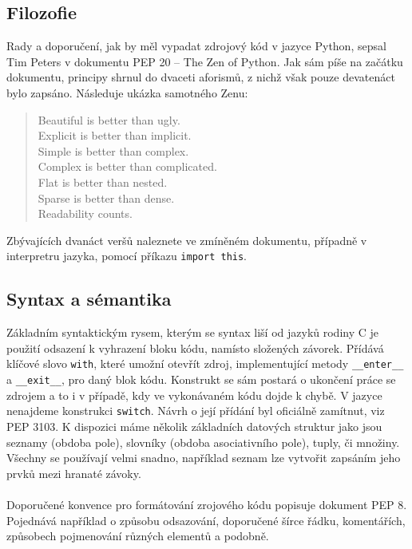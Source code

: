 \documentclass[
  field=inf,
  biblatex,
  glossaries,
  index
]{kidiplom}
\begin{document}
	\subsection{Filozofie}
	Rady a doporučení, jak by měl vypadat zdrojový kód v jazyce Python, sepsal Tim Peters v dokumentu PEP 20 -- The Zen of Python. Jak sám píše na začátku dokumentu, principy shrnul do dvaceti aforismů, z nichž však pouze devatenáct bylo zapsáno. Následuje ukázka samotného Zenu:

	\begin{verse}
	Beautiful is better than ugly.\\
	Explicit is better than implicit.\\
	Simple is better than complex.\\
	Complex is better than complicated.\\
	Flat is better than nested.\\
	Sparse is better than dense.\\
	Readability counts.\\
	\end{verse}

	Zbývajících dvanáct veršů naleznete ve zmíněném dokumentu, případně v interpretru jazyka, pomocí příkazu \texttt{import this}.

	\subsection{Syntax a sémantika}
	Základním syntaktickým rysem, kterým se syntax liší od jazyků rodiny C je použití odsazení k vyhrazení bloku kódu, namísto složených závorek. Přídává klíčové slovo \texttt{with}, které umožní otevřít zdroj, implementující metody \texttt{\_\_enter\_\_} a \texttt{\_\_exit\_\_}, pro daný blok kódu. Konstrukt se sám postará o ukončení práce se zdrojem a to i v případě, kdy ve vykonávaném kódu dojde k chybě. V jazyce nenajdeme konstrukci \texttt{switch}. Návrh o její přídání byl oficiálně zamítnut, viz PEP 3103. K dispozici máme několik základních datových struktur jako jsou seznamy (obdoba pole), slovníky (obdoba asociativního pole), tuply, či množiny. Všechny se používají velmi snadno, například seznam lze vytvořit zapsáním jeho prvků mezi hranaté závoky.
	\\
	\\
	Doporučené konvence pro formátování zrojového kódu popisuje dokument PEP 8. Pojednává například o způsobu odsazování, doporučené šírce řádku, komentářích, způsobech pojmenování různých elementů a podobně.
\end{document}
